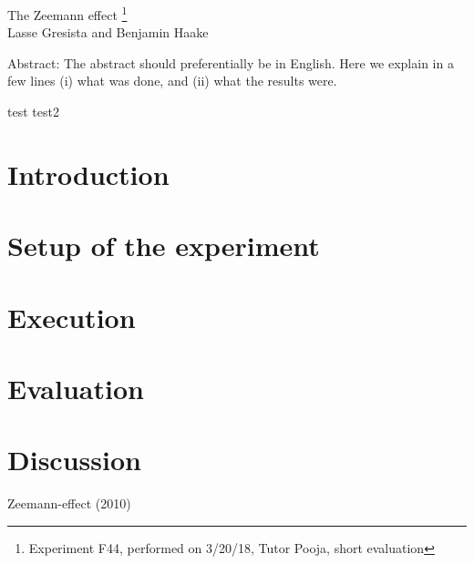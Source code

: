\documentclass[12pt]{article}
\begin{document}
\thispagestyle{empty}     %
\null
\vspace{40mm}
\begin{center}
{%
\Large  The Zeemann effect
\footnote{\noindent Experiment F44, performed on 3/20/18, Tutor Pooja, short evaluation}}\\[15mm]
Lasse Gresista and Benjamin Haake

\vspace{25mm}

\parbox{0.9\textwidth}{   %
Abstract:    
\small The abstract should preferentially be in English. Here we explain in a
few lines (i) what was done, and (ii) what the results were.
}
\end{center}
test
\vfill
\vspace{20mm}
test2
\newpage  
\null\thispagestyle{empty}

\newpage
{}

\section{Introduction}
\section{Setup of the experiment}
\section{Execution}
\section{Evaluation}
\section{Discussion}

\newpage
\begin{thebibliography}{00}   %

 Zeemann-effect (2010)

\end{thebibliography}
\end{document}
